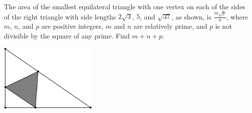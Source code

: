 The area of the smallest equilateral triangle with one vertex on each of the sides of the right triangle with side lengths $2\sqrt3$, $5$, and $\sqrt{37}$, as shown, is $\tfrac{m\sqrt{p}}{n}$, where $m$, $n$, and $p$ are positive integers, $m$ and $n$ are relatively prime, and $p$ is not divisible by the square of any prime. Find $m+n+p$.
\begin{center}
\includegraphics[width = 47.6mm]{img/fig0.png}
\end{center}
